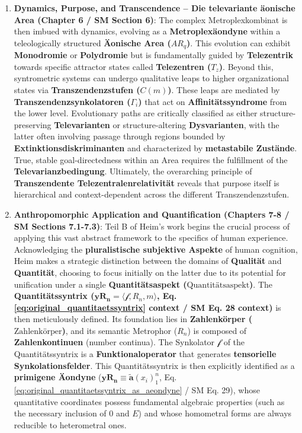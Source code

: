 \documentclass[
    12pt,              %
    a4paper,           %
    headings=normal,   %
    twoside=true,      %
    BCOR=8mm,          %
]{scrbook}
\newcommand{\synkolationsstufe}{m}
\newcommand{\telezentrum}{T_z}
\newcommand{\aeonischearea}{AR_q}
\newcommand{\transzendenzstufe}[1]{C(#1)}
\newcommand{\transzendenzsynkolator}{\Gamma_i}
\newcommand{\quantitaetsaspekt}{\text{Quantitätsaspekt}}
\newcommand{\quantitaetssyntrix}{\bm{yR_n}}
\newcommand{\zahlenkoerper}{\text{Zahlenkörper}}
\newcommand{\semantischermetrophor}{R_n}
\newcommand{\funktionaloperator}{\mathcal{f}}
\newcommand{\aeondynechaptereight}{\mathbf{\widetilde{a}}(x_i)^n_1}
\begin{document}
\begin{enumerate}
    \item \textbf{Dynamics, Purpose, and Transcendence – Die televariante äonische Area (Chapter 6 / SM Section 6)}: The complex Metroplexkombinat is then imbued with dynamics, evolving as a \textbf{Metroplexäondyne} within a teleologically structured \textbf{Äonische Area (\( \aeonischearea \))}. This evolution can exhibit \textbf{Monodromie} or \textbf{Polydromie} but is fundamentally guided by \textbf{Telezentrik} towards specific attractor states called \textbf{Telezentren (\( \telezentrum \))}. Beyond this, syntrometric systems can undergo qualitative leaps to higher organizational states via \textbf{Transzendenzstufen (\( \transzendenzstufe{m} \))}. These leaps are mediated by \textbf{Transzendenzsynkolatoren (\( \transzendenzsynkolator \))} that act on \textbf{Affinitätssyndrome} from the lower level. Evolutionary paths are critically classified as either structure-preserving \textbf{Televarianten} or structure-altering \textbf{Dysvarianten}, with the latter often involving passage through regions bounded by \textbf{Extinktionsdiskriminanten} and characterized by \textbf{metastabile Zustände}. True, stable goal-directedness within an Area requires the fulfillment of the \textbf{Televarianzbedingung}. Ultimately, the overarching principle of \textbf{Transzendente Telezentralenrelativität} reveals that purpose itself is hierarchical and context-dependent across the different Transzendenzstufen.

    \item \textbf{Anthropomorphic Application and Quantification (Chapters 7-8 / SM Sections 7.1-7.3)}: Teil B of Heim's work begins the crucial process of applying this vast abstract framework to the specifics of human experience. Acknowledging the \textbf{pluralistische subjektive Aspekte} of human cognition, Heim makes a strategic distinction between the domains of \textbf{Qualität} and \textbf{Quantität}, choosing to focus initially on the latter due to its potential for unification under a single \textbf{Quantitätsaspekt (\(\quantitaetsaspekt\))}. The \textbf{Quantitätssyntrix (\( \quantitaetssyntrix = \langle \funktionaloperator, \semantischermetrophor, \synkolationsstufe \rangle \), Eq. \eqref{eq:original_quantitaetssyntrix} context / SM Eq. 28 context)} is then meticulously defined. Its foundation lies in \textbf{Zahlenkörper (\(\zahlenkoerper\))}, and its semantic Metrophor (\( \semantischermetrophor \)) is composed of \textbf{Zahlenkontinuen} (number continua). The Synkolator \( \funktionaloperator \) of the Quantitätssyntrix is a \textbf{Funktionaloperator} that generates \textbf{tensorielle Synkolationsfelder}. This Quantitätssyntrix is then explicitly identified as a \textbf{primigene \"{A}ondyne} (\( \quantitaetssyntrix \equiv \aeondynechaptereight \), Eq. \eqref{eq:original_quantitaetssyntrix_as_aeondyne} / SM Eq. 29), whose quantitative coordinates possess fundamental algebraic properties (such as the necessary inclusion of \( 0 \) and \( E \)) and whose homometral forms are always reducible to heterometral ones.


\end{enumerate}
\end{document}
